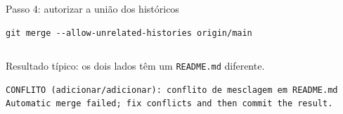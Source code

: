 \documentclass[aspectratio=169,11pt]{beamer}
\begin{document}
\begin{frame}[fragile]{Passo 4: autorizar a união dos históricos}
\begin{lstlisting}
git merge --allow-unrelated-histories origin/main
\end{lstlisting}
\vspace{2mm}
\begin{columns}[T]
\end{columns}
\vspace{4mm}
{\small Resultado típico: os dois lados têm um \texttt{README.md} diferente.}
\begin{lstlisting}[style=saida]
CONFLITO (adicionar/adicionar): conflito de mesclagem em README.md
Automatic merge failed; fix conflicts and then commit the result.
\end{lstlisting}
\end{frame}
\end{document}
